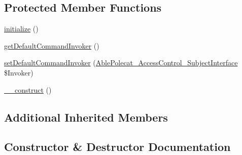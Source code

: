 \subsection*{Protected Member Functions}
\begin{DoxyCompactItemize}
\item 
\hyperlink{class_able_polecat___cache_object_abstract_a91098fa7d1917ce4833f284bbef12627}{initialize} ()
\item 
\hyperlink{class_able_polecat___cache_object_abstract_a60be366090fa500d8062c7dfc40bfaf6}{get\+Default\+Command\+Invoker} ()
\item 
\hyperlink{class_able_polecat___cache_object_abstract_a8af7037413ce56303d66df3b83c9f6d3}{set\+Default\+Command\+Invoker} (\hyperlink{interface_able_polecat___access_control___subject_interface}{Able\+Polecat\+\_\+\+Access\+Control\+\_\+\+Subject\+Interface} \$Invoker)
\item 
\hyperlink{class_able_polecat___cache_object_abstract_a095c5d389db211932136b53f25f39685}{\+\_\+\+\_\+construct} ()
\end{DoxyCompactItemize}
\subsection*{Additional Inherited Members}


\subsection{Constructor \& Destructor Documentation}
\hypertarget{class_able_polecat___cache_object_abstract_a095c5d389db211932136b53f25f39685}{}
